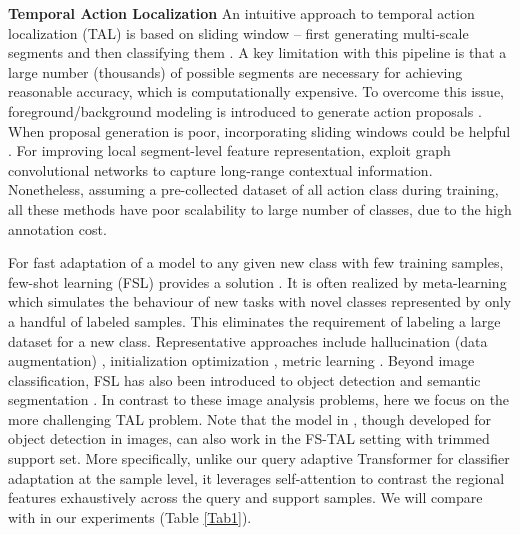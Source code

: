 \documentclass{bmvc2k}
\begin{document}
{\bf Temporal Action Localization} 
An intuitive approach to temporal action localization (TAL) is based on sliding window --
first generating multi-scale segments and then classifying them
\cite{dai2017temporal}.
A key limitation with this pipeline is that 
a large number (thousands) of possible segments are necessary 
for achieving reasonable accuracy, which is computationally expensive.
To overcome this issue, foreground/background modeling is introduced
to generate action proposals  \cite{shou2016temporal,shou2016temporal,gao2017turn,zhao2017temporal,lin2018bsn,lin2019bmn}.
When proposal generation is poor,
incorporating sliding windows could be helpful
\cite{gao2018ctap}.
For improving local segment-level feature representation, \cite{zeng2019graph,xu2020gtad} exploit graph convolutional networks to capture long-range contextual information.
Nonetheless, assuming a pre-collected dataset of all action class during training, all these methods have poor scalability to large number of classes, due to the high annotation cost. 



For fast adaptation of a model to any given new class with few training samples,
few-shot learning (FSL) provides a solution \cite{vinyals2016matching, sung2018learning, snell2017prototypical}.
It is often realized by meta-learning which simulates the behaviour of new tasks with novel classes represented by only a handful of labeled samples.
This eliminates the requirement of labeling a large dataset
for a new class.
Representative approaches include
hallucination (data augmentation) \cite{hariharan2017low, wang2018low},
initialization optimization \cite{finn2017model,rusu2018meta,ravi2016optimization},
metric learning \cite{koch2015siamese,sung2018learning}.
Beyond image classification, FSL has also been introduced to object detection \cite{kang2019few,dong2018few,hu2019silco} and semantic segmentation \cite{shaban2017one,zhang2020sg,zhang2019canet,wangfew}. 
In contrast to these image analysis problems,
here we focus on the more challenging TAL problem.
Note that the model in \cite{hu2019silco}, though developed for object detection in images, can also work in the FS-TAL setting with trimmed support set.
More specifically, unlike our query adaptive Transformer for classifier adaptation at the sample level, it leverages self-attention to contrast the regional features 
exhaustively across the query and support samples.
We will compare with \cite{hu2019silco}
in our experiments (Table \ref{Tab1}).
\end{document}
